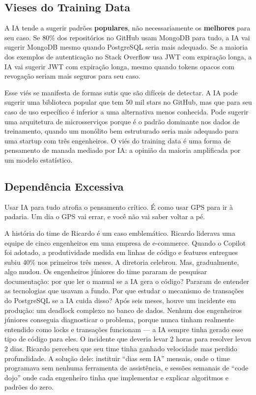 \subsection{Vieses do Training Data}

A IA tende a sugerir padrões \textbf{populares}, não necessariamente os
\textbf{melhores} para seu caso. Se 80\% dos repositórios no GitHub usam
MongoDB para tudo, a IA vai sugerir MongoDB mesmo quando PostgreSQL seria
mais adequado. Se a maioria dos exemplos de autenticação no Stack Overflow
usa JWT com expiração longa, a IA vai sugerir JWT com expiração longa, mesmo
quando tokens opacos com revogação seriam mais seguros para seu caso.

Esse viés se manifesta de formas sutis que são difíceis de detectar. A IA pode sugerir
uma biblioteca popular que tem 50 mil stars no GitHub, mas que para seu caso de uso
específico é inferior a uma alternativa menos conhecida. Pode sugerir uma arquitetura
de microsserviços porque é o padrão dominante nos dados de treinamento, quando um
monólito bem estruturado seria mais adequado para uma startup com três engenheiros.
O viés do training data é uma forma de pensamento de manada mediado
por IA: a opinião da maioria amplificada por um modelo estatístico.

\subsection{Dependência Excessiva}

Usar IA para tudo atrofia o pensamento crítico. É como usar GPS para ir à
padaria. Um dia o GPS vai errar, e você não vai saber voltar a pé.

A história do time de Ricardo é um caso emblemático. Ricardo liderava uma equipe de
cinco engenheiros em uma empresa de e-commerce. Quando o Copilot foi adotado, a
produtividade medida em linhas de código e features entregues subiu 40\% nos primeiros
três meses. A diretoria celebrou. Mas, gradualmente, algo mudou. Os engenheiros
júniores do time pararam de pesquisar documentação: por que ler o manual se a IA
gera o código? Pararam de entender as tecnologias que usavam a fundo. Por que
estudar o mecanismo de transações do PostgreSQL se a IA cuida disso? Após seis meses,
houve um incidente em produção: um deadlock complexo no banco de dados. Nenhum dos
engenheiros júniores conseguia diagnosticar o problema, porque nunca tinham realmente
entendido como locks e transações funcionam --- a IA sempre tinha gerado esse tipo
de código para eles. O incidente que deveria levar 2 horas para resolver levou 2 dias.
Ricardo percebeu que seu time tinha ganhado velocidade mas perdido profundidade. A
solução dele: instituir ``dias sem IA'' mensais, onde o time programava sem nenhuma
ferramenta de assistência, e sessões semanais de ``code dojo'' onde cada engenheiro
tinha que implementar e explicar algoritmos e padrões do zero.

